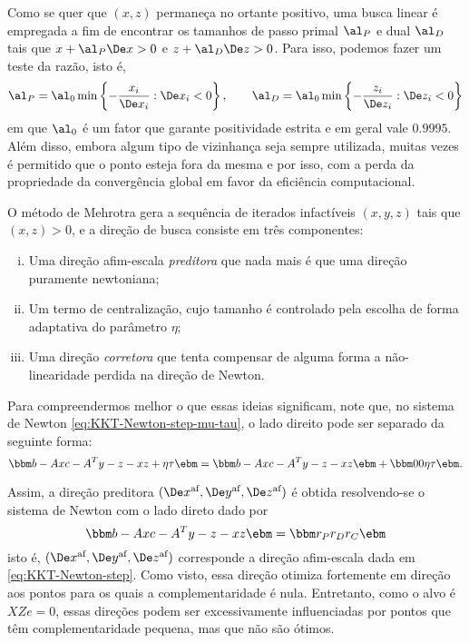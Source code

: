 Como se quer que $(x,z)$ permaneça no ortante positivo, uma busca
linear é empregada a fim de encontrar os tamanhos de passo primal $\al_P$ e dual $\al_D$  tais que
$x+\al_P\Dex >0$ e $z+\al_D\Dez >0$. Para isso, podemos fazer um teste da
razão, isto é,
\begin{equation}
\label{eq:size-step}
\al_P = \al_0\min \left\{- \frac{x_i}{\Dex_i} : \Dex_i <
0\right\}, \qquad \al_D = \al_0\min \left\{- \frac{z_i}{\Dez_i} : \Dez_i <
0\right\}
\end{equation} 
em que $\al_0$ é um fator que garante positividade estrita e em geral vale
$\num{0.9995}$. Além disso, embora   algum tipo de vizinhança seja sempre utilizada, muitas
vezes é permitido que o ponto esteja fora da mesma e por isso, com a perda da
propriedade da convergência global em favor da eficiência computacional. 


O método de Mehrotra gera a sequência de iterados infactíveis
$(x,y,z)$ tais que $(x,z)>0$, e a direção de busca consiste em três componentes:
\begin{enumerate}[(i)]
  \item Uma  direção afim-escala \emph{preditora} que nada mais é que uma direção puramente newtoniana; 
  
  \item Um termo de centralização,
  cujo tamanho é controlado pela escolha de forma adaptativa do parâmetro $\eta$;
   \item Uma direção  \emph{corretora}  que tenta compensar de alguma forma a não-linearidade perdida na direção de Newton.
\end{enumerate}




Para compreendermos melhor o que essas ideias significam, note que, no sistema de
Newton \eqref{eq:KKT-Newton-step-mu-tau}, o lado direito pode ser separado da seguinte forma:
\[
\bbm b-Ax \\ c - A^Ty - z \\ -xz + \eta\tau \ebm = 
 \bbm b-Ax \\ c - A^Ty - z \\ -xz  \ebm +  \bbm 0 \\ 0 \\ 
 \eta\tau \ebm.
 \] 


Assim, a direção preditora $(\dex, \dey, \dez)$ é obtida resolvendo-se o
sistema de Newton com o lado direto dado por
 \begin{equation}
 \label{eq:afinne-scale-step}
 \bbm b-Ax\\ c - A^Ty - z \\ -xz  \ebm =  \bbm r_P\\ r_D \\ r_C  \ebm 
 \end{equation} 
 isto é,  $(\dex, \dey, \dez)$  corresponde a direção afim-escala dada em
\eqref{eq:KKT-Newton-step}. Como visto, essa direção otimiza fortemente em
direção aos pontos para os quais a complementaridade é nula. Entretanto, como o
alvo é $XZe = 0$, essas direções podem ser excessivamente influenciadas por
pontos que têm complementaridade pequena, mas que não são ótimos.


